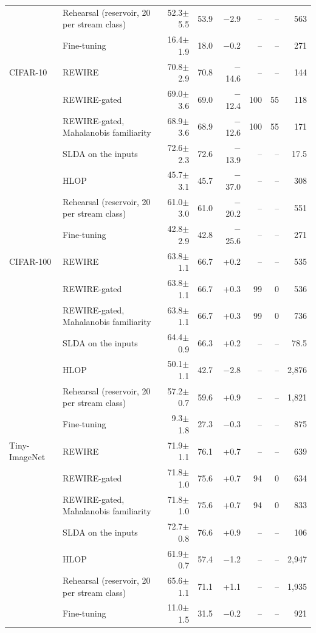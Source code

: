 \begin{tabular*}{\textwidth}{@{\extracolsep{\fill}}llrrrrrr@{}}
 & Rehearsal (reservoir, 20 per stream class) & 52.3$\pm$5.5 & 53.9 & \ensuremath{-}2.9 & -- & -- & 563 \\
 & Fine-tuning & 16.4$\pm$1.9 & 18.0 & \ensuremath{-}0.2 & -- & -- & 271 \\
CIFAR-10 & REWIRE & 70.8$\pm$2.9 & 70.8 & \ensuremath{-}14.6 & -- & -- & 144 \\
 & REWIRE-gated & 69.0$\pm$3.6 & 69.0 & \ensuremath{-}12.4 & 100 & 55 & 118 \\
 & REWIRE-gated, Mahalanobis familiarity & 68.9$\pm$3.6 & 68.9 & \ensuremath{-}12.6 & 100 & 55 & 171 \\
 & SLDA on the inputs & 72.6$\pm$2.3 & 72.6 & \ensuremath{-}13.9 & -- & -- & 17.5 \\
 & HLOP & 45.7$\pm$3.1 & 45.7 & \ensuremath{-}37.0 & -- & -- & 308 \\
 & Rehearsal (reservoir, 20 per stream class) & 61.0$\pm$3.0 & 61.0 & \ensuremath{-}20.2 & -- & -- & 551 \\
 & Fine-tuning & 42.8$\pm$2.9 & 42.8 & \ensuremath{-}25.6 & -- & -- & 271 \\
CIFAR-100 & REWIRE & 63.8$\pm$1.1 & 66.7 & +0.2 & -- & -- & 535 \\
 & REWIRE-gated & 63.8$\pm$1.1 & 66.7 & +0.3 & 99 & 0 & 536 \\
 & REWIRE-gated, Mahalanobis familiarity & 63.8$\pm$1.1 & 66.7 & +0.3 & 99 & 0 & 736 \\
 & SLDA on the inputs & 64.4$\pm$0.9 & 66.3 & +0.2 & -- & -- & 78.5 \\
 & HLOP & 50.1$\pm$1.1 & 42.7 & \ensuremath{-}2.8 & -- & -- & 2,876 \\
 & Rehearsal (reservoir, 20 per stream class) & 57.2$\pm$0.7 & 59.6 & +0.9 & -- & -- & 1,821 \\
 & Fine-tuning & 9.3$\pm$1.8 & 27.3 & \ensuremath{-}0.3 & -- & -- & 875 \\
Tiny-ImageNet & REWIRE & 71.9$\pm$1.1 & 76.1 & +0.7 & -- & -- & 639 \\
 & REWIRE-gated & 71.8$\pm$1.0 & 75.6 & +0.7 & 94 & 0 & 634 \\
 & REWIRE-gated, Mahalanobis familiarity & 71.8$\pm$1.0 & 75.6 & +0.7 & 94 & 0 & 833 \\
 & SLDA on the inputs & 72.7$\pm$0.8 & 76.6 & +0.9 & -- & -- & 106 \\
 & HLOP & 61.9$\pm$0.7 & 57.4 & \ensuremath{-}1.2 & -- & -- & 2,947 \\
 & Rehearsal (reservoir, 20 per stream class) & 65.6$\pm$1.1 & 71.1 & +1.1 & -- & -- & 1,935 \\
 & Fine-tuning & 11.0$\pm$1.5 & 31.5 & \ensuremath{-}0.2 & -- & -- & 921 \\
\bottomrule
\end{tabular*}

